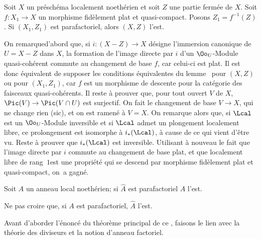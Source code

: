 \begin{lemme} \label{XI.3.6} Soit $X$ un pr\'esch\'ema localement noeth\'erien et soit $Z$ une partie ferm\'ee de $X$. Soit $f\colon X_1\to X$ un morphisme fid\`element plat et quasi-compact. Posons $Z_1=f^{-1}(Z)$. Si $(X_1, Z_1)$ est parafactoriel, alors $(X, Z)$ l'est.
\end{lemme}

On remarque\pageoriginale d'abord que, si $i\colon(X-Z)\to X$ d\'esigne l'immersion canonique de $U=X-Z$ dans $X$, la formation de l'image directe par $i$ d'un $\Oo_U$-Module quasi-coh\'erent commute au changement de base $f$, car celui-ci est plat. Il est donc \'equivalent de supposer les conditions \'equivalentes du lemme~ pour $(X, Z)$ ou pour $(X_1, Z_1)$, car $f$ est un morphisme de descente pour la cat\'egorie des faisceaux quasi-coh\'erents. Il reste \`a prouver que, pour tout ouvert $V$ de $X$, $\Pic(V)\to\Pic(V\cap U)$ est surjectif. On fait le changement de base $V\to X$, qui ne change rien (sic), et on est ramen\'e \`a $V=X$. On remarque alors que, si ${\Lcal}$ est un $\Oo_U$-Module inversible et si ${\Lcal}$ admet un plongement localement libre, ce prolongement est isomorphe \`a $i_*({\Lcal})$, \`a cause de ce qui vient d'\^etre vu. Reste \`a prouver que $i_*({\Lcal})$ est inversible. Utilisant \`a nouveau le fait que l'image directe par $i$ commute au changement de base plat, et que \og localement libre de rang~$1$\fg est une propri\'et\'e qui se descend par morphisme fid\`element plat et quasi-compact, on~a gagn\'e.

\begin{corollaire} \label{XI.3.7} Soit $A$ un anneau local noeth\'erien; si $\hat A$ est parafactoriel $A$ l'est.
\end{corollaire}

Ne pas croire que, si $A$ est parafactoriel, $\hat A$ l'est.

\danger

Avant d'aborder l'\'enonc\'e du th\'eor\`eme principal de ce \no, faisons le lien avec la th\'eorie des diviseurs et la notion d'anneau factoriel.

